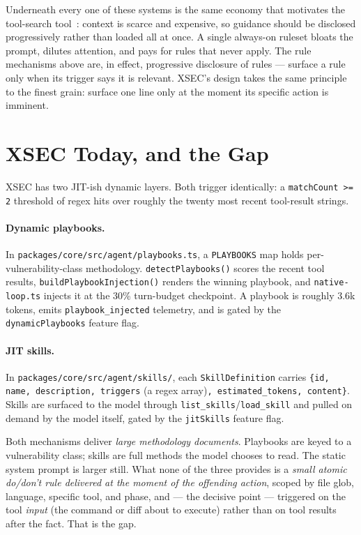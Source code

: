 \documentclass[11pt]{article}
\begin{document}
Underneath every one of these systems is the same economy that motivates the
tool-search tool~\cite{toolsearch}: context is scarce and expensive, so
guidance should be disclosed progressively rather than loaded all at once. A
single always-on ruleset bloats the prompt, dilutes attention, and pays for
rules that never apply. The rule mechanisms above are, in effect, progressive
disclosure of rules --- surface a rule only when its trigger says it is relevant.
XSEC's design takes the same principle to the finest grain: surface one line only
at the moment its specific action is imminent.

\section{XSEC Today, and the Gap}
\label{sec:gap}

XSEC has two JIT-ish dynamic layers. Both trigger identically: a
\texttt{matchCount >= 2} threshold of regex hits over roughly the twenty most
recent tool-result strings.

\paragraph{Dynamic playbooks.} In
\texttt{packages/core/src/agent/playbooks.ts}, a \texttt{PLAYBOOKS} map holds
per-vulnerability-class methodology. \texttt{detectPlaybooks()} scores the recent
tool results, \texttt{buildPlaybookInjection()} renders the winning playbook, and
\texttt{native-loop.ts} injects it at the 30\% turn-budget checkpoint. A playbook
is roughly 3.6k tokens, emits \texttt{playbook\_injected} telemetry, and is gated
by the \texttt{dynamicPlaybooks} feature flag.

\paragraph{JIT skills.} In \texttt{packages/core/src/agent/skills/}, each
\texttt{SkillDefinition} carries \texttt{\{id, name, description, triggers}
(a regex array)\texttt{, estimated\_tokens, content\}}. Skills are surfaced to the
model through \texttt{list\_skills}/\texttt{load\_skill} and pulled on demand by
the model itself, gated by the \texttt{jitSkills} feature flag.

Both mechanisms deliver \emph{large methodology documents}. Playbooks are keyed
to a vulnerability class; skills are full methods the model chooses to read. The
static system prompt is larger still. What none of the three provides is a
\emph{small atomic do/don't rule delivered at the moment of the offending
action}, scoped by file glob, language, specific tool, and phase, and --- the
decisive point --- triggered on the tool \emph{input} (the command or diff about
to execute) rather than on tool results after the fact. That is the gap.
\end{document}
